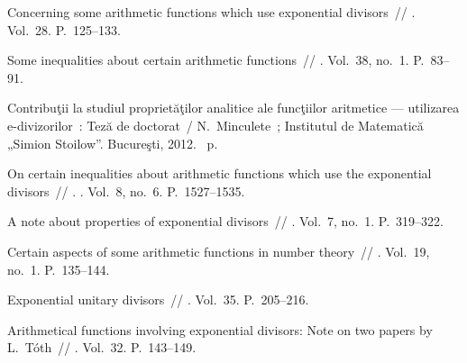 \documentclass{article}
\begin{document}
\begin{thebibliography}{10}
 Concerning some arithmetic functions which use
  exponential divisors~// 
  \BibDash
{}. \BibDash
\newblock Vol.~28. \BibDash
\newblock P.~125--133.

 Some inequalities about certain arithmetic functions~//
   \BibDash
{}. \BibDash
\newblock Vol.~38, no.~1. \BibDash
\newblock P.~83--91.

 Contribuţii la studiul proprietăţilor analitice ale
  funcţiilor aritmetice --- utilizarea e-divizorilor~: Teză de doctorat~/
  N.~Minculete~; Institutul de Matematică „Simion Stoilow”. \BibDash
\newblock Bucureşti, 2012. \BibDash
{}~p.

 On certain inequalities about arithmetic functions which
  use the exponential divisors~//
  \href{http://dx.doi.org/10.1142/S1793042112500923}{}. \BibDash
{}. \BibDash
\newblock Vol.~8, no.~6. \BibDash
\newblock P.~1527--1535.

 A note about properties of exponential divisors~//
   \BibDash
{}. \BibDash
\newblock Vol.~7, no.~1. \BibDash
\newblock P.~319--322.

 Certain aspects of some arithmetic functions in
  number theory~//  \BibDash
{}. \BibDash
\newblock Vol.~19, no.~1. \BibDash
\newblock P.~135--144.

 Exponential unitary divisors~//  \BibDash
{}. \BibDash
\newblock Vol.~35. \BibDash
\newblock P.~205--216.

 Arithmetical functions involving exponential
  divisors: Note on two papers by L.~Tóth~//  \BibDash
{}. \BibDash
\newblock Vol.~32. \BibDash
\newblock P.~143--149.


\end{thebibliography}
\end{document}
